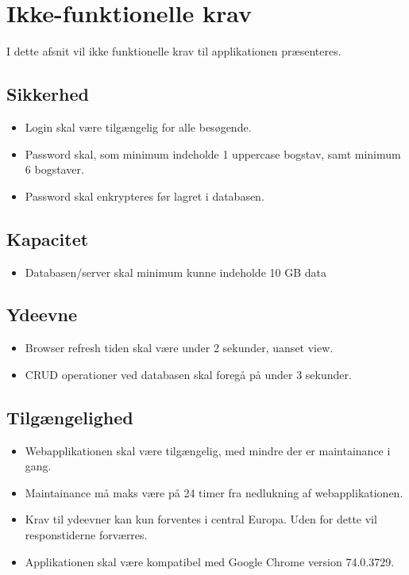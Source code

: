 \section{Ikke-funktionelle krav}
I dette afsnit vil ikke funktionelle krav til applikationen præsenteres.

\noindent 
\subsection{Sikkerhed}

\begin{itemize}

\item  Login skal v{\ae}re tilg{\ae}ngelig for alle bes{\o}gende.

\item  Password skal, som minimum indeholde 1 uppercase bogstav, samt minimum 6 bogstaver.

\item  Password skal enkrypteres f{\o}r lagret i databasen.
\end{itemize}

\noindent 
\subsection{Kapacitet}

\begin{itemize}
\item  Databasen/server skal minimum kunne indeholde 10 GB data

\end{itemize}

\noindent 
\subsection{Ydeevne}

\begin{itemize}
\item  Browser refresh tiden skal v{\ae}re under 2 sekunder, uanset view.

\item  CRUD operationer ved databasen skal foreg{\aa} p{\aa} under 3 sekunder.
\end{itemize}

\noindent 
\subsection{Tilg{\ae}ngelighed}

\begin{itemize}
\item  Webapplikationen skal v{\ae}re tilg{\ae}ngelig, med mindre der er maintainance i gang.

\item  Maintainance m{\aa} maks v{\ae}re p{\aa} 24 timer fra nedlukning af webapplikationen. 

\item  Krav til ydeevner kan kun forventes i central Europa. Uden for dette vil responstiderne forv{\ae}rres.

\item Applikationen skal være kompatibel med Google Chrome version 74.0.3729.
\end{itemize}

